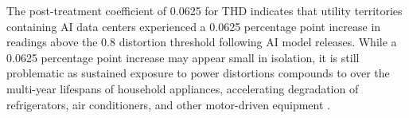 \documentclass[sigconf,authordraft]{acmart}
\newcommand{\nb}[1]{\textcolor{blue}{NB[#1]}}
\begin{document}
The post-treatment coefficient of 0.0625 for THD indicates that utility territories containing AI data centers experienced a 0.0625 percentage point increase in readings above the 0.8 distortion threshold following AI model releases. 
While a 0.0625 percentage point increase may appear small in isolation, it is still problematic as sustained exposure to power distortions compounds to over the multi-year lifespans of household appliances, accelerating degradation of refrigerators, air conditioners, and other motor-driven equipment \cite{NEMA_MG1,Laughner2024THD}.


\end{document}
